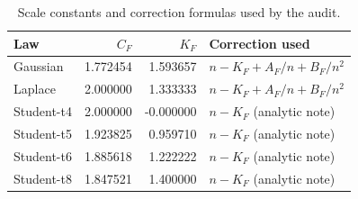 \begin{table}[H]
\centering
\caption{Scale constants and correction formulas used by the audit.}
\label{tab:constants}
\begin{tabular}{lrrl}
\toprule
Law & $C_F$ & $K_F$ & Correction used \\
\midrule
Gaussian & 1.772454 & 1.593657 & $n-K_F+A_F/n+B_F/n^2$ \\
Laplace & 2.000000 & 1.333333 & $n-K_F+A_F/n+B_F/n^2$ \\
Student-t4 & 2.000000 & -0.000000 & $n-K_F$ (analytic note) \\
Student-t5 & 1.923825 & 0.959710 & $n-K_F$ (analytic note) \\
Student-t6 & 1.885618 & 1.222222 & $n-K_F$ (analytic note) \\
Student-t8 & 1.847521 & 1.400000 & $n-K_F$ (analytic note) \\
\bottomrule
\end{tabular}
\end{table}

